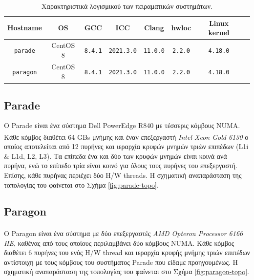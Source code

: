 \begin{table}
	\centering
		\begin{tabular}{|c||c|c|c|c|c|c|c|}
		\hline
		Hostname & OS & GCC & ICC & Clang & hwloc & Linux kernel \\
		\hline \hline
		\texttt{parade} & CentOS 8 & \texttt{8.4.1} & \texttt{2021.3.0} & \texttt{11.0.0} & \texttt{2.2.0} & \texttt{4.18.0} \\
		\hline
		\texttt{paragon} & CentOS 8 & \texttt{8.4.1} & \texttt{2021.3.0} & \texttt{11.0.0} & \texttt{2.2.0} & \texttt{4.18.0} \\
		\hline
		\end{tabular}
		\caption{Χαρακτηριστικά λογισμικού των πειραματικών συστημάτων.}
		\label{tab:exp-systems-software}
\end{table}


\subsection{Parade}
Ο Parade είναι ένα σύστημα Dell PowerEdge R840 με τέσσερις κόμβους NUMA. Κάθε κόμβος διαθέτει 64 GBs μνήμης και έναν επεξεργαστή \textit{Intel\textsuperscript{\textregistered} Xeon\textsuperscript{\textregistered} Gold 6130} ο οποίος αποτελείται από 12 πυρήνες και ιεραρχία κρυφών μνημών τριών επιπέδων (L1i \& L1d, L2, L3). Τα επίπεδα ένα και δύο των κρυφών μνημών είναι κοινά ανά πυρήνα, ενώ το επίπεδο τρία είναι κοινό για όλους τους πυρήνες του επεξεργαστή. Επίσης, κάθε πυρήνας περιέχει δύο H/W threads. Η σχηματική αναπαράσταση της τοπολογίας του φαίνεται στο Σχήμα \ref{fig:parade-topo}.

\subsection{Paragon}
Ο Paragon είναι ένα σύστημα με δύο επεξεργαστές \textit{AMD Opteron\textsuperscript{\texttrademark} Processor 6166 HE}, καθένας από τους οποίους περιλαμβάνει δύο κόμβους NUMA. Κάθε κόμβος διαθέτει 6 πυρήνες του ενός H/W thread και ιεραρχία κρυφής μνήμης τριών επιπέδων αντίστοιχη με τους κόμβους του συστήματος Parade που είδαμε προηγουμένως. Η σχηματική αναπαράσταση της τοπολογίας του φαίνεται στο Σχήμα \ref{fig:paragon-topo}.

